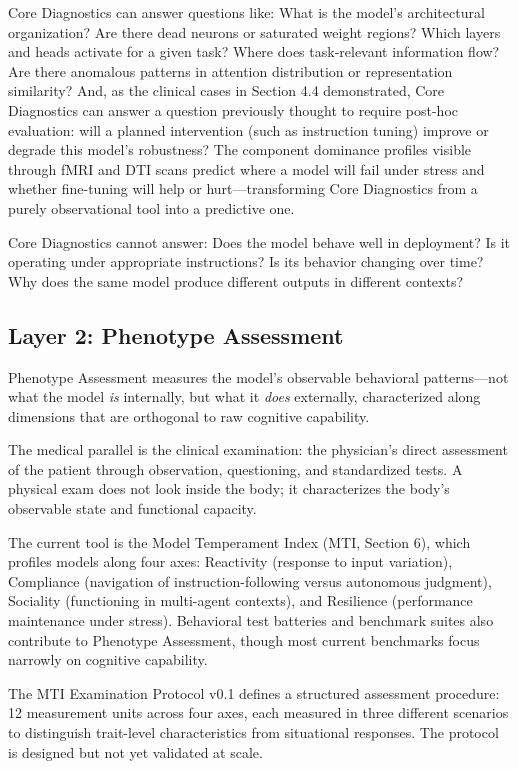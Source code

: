 \documentclass[11pt]{article}
\begin{document}
Core Diagnostics can answer questions like: What is the model's architectural organization? Are there dead neurons or saturated weight regions? Which layers and heads activate for a given task? Where does task-relevant information flow? Are there anomalous patterns in attention distribution or representation similarity? And, as the clinical cases in Section 4.4 demonstrated, Core Diagnostics can answer a question previously thought to require post-hoc evaluation: will a planned intervention (such as instruction tuning) improve or degrade this model's robustness? The component dominance profiles visible through fMRI and DTI scans predict where a model will fail under stress and whether fine-tuning will help or hurt---transforming Core Diagnostics from a purely observational tool into a predictive one.

Core Diagnostics cannot answer: Does the model behave well in deployment? Is it operating under appropriate instructions? Is its behavior changing over time? Why does the same model produce different outputs in different contexts?

\subsection{Layer 2: Phenotype Assessment}

Phenotype Assessment measures the model's observable behavioral patterns---not what the model \emph{is} internally, but what it \emph{does} externally, characterized along dimensions that are orthogonal to raw cognitive capability.

The medical parallel is the clinical examination: the physician's direct assessment of the patient through observation, questioning, and standardized tests. A physical exam does not look inside the body; it characterizes the body's observable state and functional capacity.

The current tool is the Model Temperament Index (MTI, Section 6), which profiles models along four axes: Reactivity (response to input variation), Compliance (navigation of instruction-following versus autonomous judgment), Sociality (functioning in multi-agent contexts), and Resilience (performance maintenance under stress). Behavioral test batteries and benchmark suites also contribute to Phenotype Assessment, though most current benchmarks focus narrowly on cognitive capability.

The MTI Examination Protocol v0.1 defines a structured assessment procedure: 12 measurement units across four axes, each measured in three different scenarios to distinguish trait-level characteristics from situational responses. The protocol is designed but not yet validated at scale.
\end{document}
